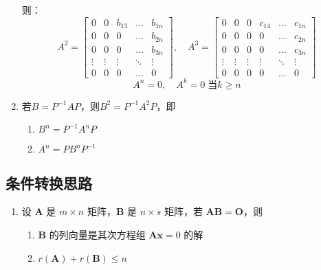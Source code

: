 \documentclass[a4paper,12pt]{article}
\begin{document}
\begin{enumerate}
        则：
        \[
            A^2 =
            \begin{bmatrix}
                0      & 0      & b_{13} & \dots  & b_{1n} \\
                0      & 0      & 0      & \dots  & b_{2n} \\
                0      & 0      & 0      & \dots  & b_{3n} \\
                \vdots & \vdots & \vdots & \ddots & \vdots \\
                0      & 0      & 0      & \dots  & 0
            \end{bmatrix}, \quad
            A^3 =
            \begin{bmatrix}
                0      & 0      & 0      & c_{14} & \dots  & c_{1n} \\
                0      & 0      & 0      & 0      & \dots  & c_{2n} \\
                0      & 0      & 0      & 0      & \dots  & c_{3n} \\
                \vdots & \vdots & \vdots & \vdots & \ddots & \vdots \\
                0      & 0      & 0      & 0      & \dots  & 0
            \end{bmatrix}
        \]
        \[
            A^n = 0, \quad A^k = 0 \; \text{当} k \ge n
        \]
        \item 若$B = P^{-1}AP$，则$B^2 = P^{-1}A^{2}P$，即
        \begin{enumerate}
            \item $B^n = P^{-1}A^{n}P$
            \item $A^n = PB^{n}P^{-1}$
        \end{enumerate}
    \end{enumerate}

    \subsection{条件转换思路}

    \begin{enumerate}
        \item 设 $\mathbf{A}$ 是 $m \times n$ 矩阵，$\mathbf{B}$ 是 $n \times s$ 矩阵，若 $\mathbf{AB} = \mathbf{O}$，则
        \begin{enumerate}
            \item $\mathbf{B}$ 的列向量是其次方程组 $\mathbf{Ax} = 0$ 的解
            \item $r(\mathbf{A}) + r(\mathbf{B}) \le n$
        \end{enumerate}
    \end{enumerate}
\end{document}
